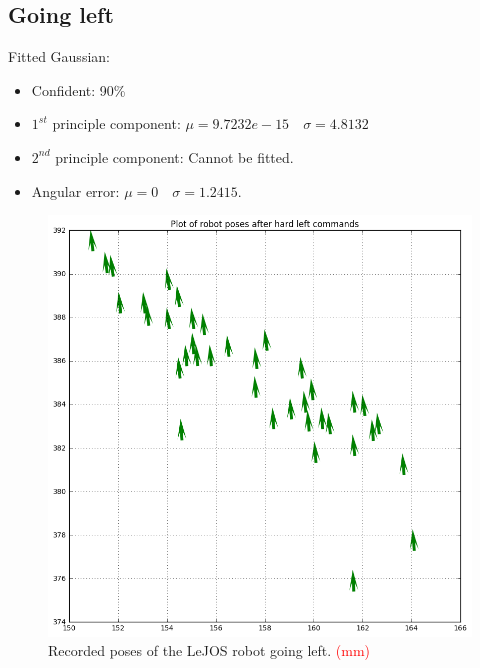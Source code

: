 \documentclass[paper=a4, fontsize=11pt]{scrartcl} %
\begin{document}
    \subsection{Going left}
        Fitted Gaussian:
        \begin{itemize}
        	\item Confident: 90\%
    	    \item $1^{st}$ principle component: $\mu = 9.7232e-15 \quad \sigma = 4.8132$
    	    \item $2^{nd}$ principle component: Cannot be fitted.
    	    \item Angular error: $\mu = 0 \quad \sigma = 1.2415$.
        \end{itemize}
    \begin{figure}[h!]
        \begin{center}
            \setlength{\fboxsep}{0.5pt} %
            \setlength{\fboxrule}{0.5pt}
            \includegraphics[width=12cm,fbox]{images/poses_plot_4_left.png}
            \caption{Recorded poses of the LeJOS robot going left. \textcolor{red}{(mm)}}
        \end{center}
    \end{figure}
\end{document}

